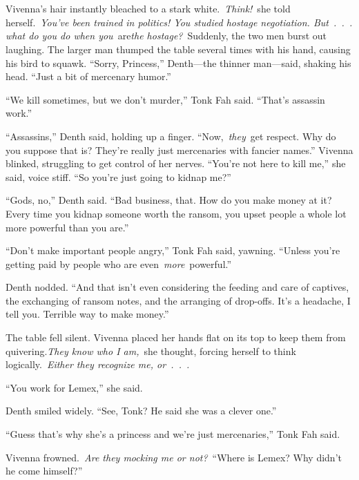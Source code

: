 \chapter{}

Vivenna’s hair instantly bleached to a stark white.~\textit{Think!}~she told herself.~\textit{You’ve been trained in politics! You studied hostage negotiation. But~.~.~. what do you do when you}~are\textit{the hostage?}~Suddenly, the two men burst out laughing. The larger man thumped the table several times with his hand, causing his bird to squawk. “Sorry, Princess,” Denth—the thinner man—said, shaking his head. “Just a bit of mercenary humor.”

“We kill sometimes, but we don’t murder,” Tonk Fah said. “That’s assassin work.”

“Assassins,” Denth said, holding up a finger. “Now,~\textit{they}~get respect. Why do you suppose that is? They’re really just mercenaries with fancier names.” Vivenna blinked, struggling to get control of her nerves. “You’re not here to kill me,” she said, voice stiff. “So you’re just going to kidnap me?”

“Gods, no,” Denth said. “Bad business, that. How do you make money at it? Every time you kidnap someone worth the ransom, you upset people a whole lot more powerful than you are.”

“Don’t make important people angry,” Tonk Fah said, yawning. “Unless you’re getting paid by people who are even~\textit{more}~powerful.”

Denth nodded. “And that isn’t even considering the feeding and care of captives, the exchanging of ransom notes, and the arranging of drop-offs. It’s a headache, I tell you. Terrible way to make money.”

The table fell silent. Vivenna placed her hands flat on its top to keep them from quivering.\textit{They know who I am,}~she thought, forcing herself to think logically.~\textit{Either they recognize me, or~.~.~.}

“You work for Lemex,” she said.

Denth smiled widely. “See, Tonk? He said she was a clever one.”

“Guess that’s why she’s a princess and we’re just mercenaries,” Tonk Fah said.

Vivenna frowned.~\textit{Are they mocking me or not?}~“Where is Lemex? Why didn’t he come himself?”

